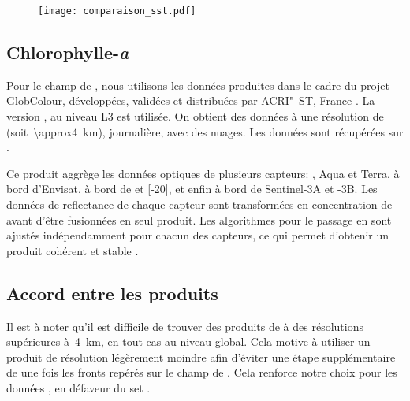 \begin{figure}
  \texttt{[image: comparaison\_sst.pdf]}
  \label{fig:comparaison-sst}
\end{figure}

\subsection{Chlorophylle-\emph{a}}
\label{sec:donnees-chl}

Pour le champ de , nous utilisons les données produites dans le cadre du projet GlobColour, développées, validées et distribuées par ACRI"~ST, France \parencite{maritorena_2002}.
La version , au niveau L3 est utilisée.
On obtient des données à une résolution de~ (soit~\qty{\approx4}{\km}), journalière, avec des nuages.
Les données sont récupérées sur .

Ce produit aggrège les données optiques de plusieurs capteurs: ,  Aqua et Terra,  à bord d'Envisat,  à bord de  et [-20], et enfin  à bord de Sentinel-3A et -3B.
Les données de reflectance de chaque capteur sont transformées en concentration de  avant d'être fusionnées en seul produit.
Les algorithmes pour le passage en  sont ajustés indépendamment pour chacun des capteurs, ce qui permet d'obtenir un produit cohérent et stable \parencite{garnesson_2019}.


\subsection{Accord entre les produits}

Il est à noter qu'il est difficile de trouver des produits de  à des résolutions supérieures à~\qty{4}{\km}, en tout cas au niveau global.
Cela motive à utiliser un produit  de résolution légèrement moindre afin d'éviter une étape supplémentaire de  une fois les fronts repérés sur le champ de .
Cela renforce notre choix pour les données , en défaveur du set .

